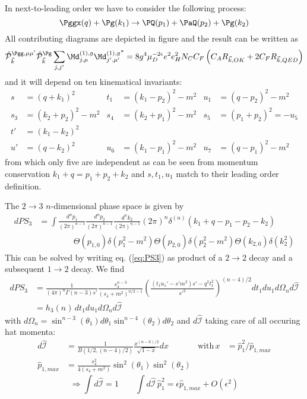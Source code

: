\label{sec:NLO.g}
In next-to-leading order we have to consider the following process:
\begin{equation}
\Pggx(q) + \Pg(k_1) \rightarrow \PQ(p_1)+\PaQ(p_2) + \Pg(k_2)
\end{equation}
All contributing diagrams are depicted in figure  and the result can be written as
\begin{equation}
\hat {\mathcal P}_{\vec k}^{\Pgg,\mu\mu'}\hat {\mathcal P}_{\vec k}^{\Pg}\sum_{j,j'}{\Md^{(1),g}_{j,\mu}\Md^{(1),g}_{j',\mu'}}^* = 8g^4\mu_D^{-2\epsilon}e^2e_H^2 N_C C_F\left( C_A R_{\vec k,OK} + 2C_F R_{\vec k,QED}\right)
\end{equation}
and it will depend on ten kinematical invariants:
\begin{align}
s &= (q+k_1)^2 &t_1 &=(k_1-p_2)^2-m^2 &u_1 &=(q-p_2)^2 -m^2\\
s_3 &= (k_2+p_2)^2-m^2 &s_4 &=(k_2+p_1)^2-m^2 &s_5 &= (p_1+p_2)^2=-u_5\\
t' &= (k_1-k_2)^2\\
u' &= (q-k_2)^2 &u_6 &=(k_1-p_1)^2-m^2 &u_7 &=(q-p_1)^2-m^2
\end{align}
from which only five are independent as can be seen from momentum conservation $k_1+q=p_1+p_2+k_2$ and $s,t_1,u_1$ match to their leading order definition.

The $2\rightarrow 3$ $n$-dimensional phase space is given by
\begin{align}
dPS_3 &= \!\int\!\!\frac{d^{n}p_1}{(2\pi)^{n-1}}\frac{d^{n}p_2}{(2\pi)^{n-1}}\frac{d^{n}k_2}{(2\pi)^{n-1}}(2\pi)^n\delta^{(n)}(k_1+q-p_1-p_2-k_2) \nonumber\\
 &\hspace{50pt}\Theta(p_{1,0})\delta(p_1^2-m^2)\Theta(p_{2,0})\delta(p_2^2-m^2)\Theta(k_{2,0})\delta(k_2^2) \label{eq:PS3}
\end{align}
This can be solved by writing eq. (\ref{eq:PS3}) as product of a $2\rightarrow 2$ decay and a subsequent $1\rightarrow 2$ decay\cite{PhysRevD4054}. We find
\begin{align}
dPS_3 &= \frac 1 {(4\pi)^n\Gamma(n-3)s'} \frac{s_4^{n-3}}{(s_4+m^2)^{n/2-1}}\left(\frac{(t_1u_1'-s'm^2)s' - q^2t_1^2}{s'^2}\right)^{(n-4)/2}\! dt_1 du_1 d\Omega_n d\hat{\mathcal I}\\
 &=h_3(n)\,dt_1 du_1 d\Omega_n d\hat{\mathcal I}
\end{align}
with $d\Omega_n = \sin^{n-3}(\theta_1)d\theta_1\sin^{n-4}(\theta_2)d\theta_2$ and $d\hat{\mathcal I}$ taking care of all occuring hat momenta:
\begin{align}
d\hat{\mathcal I} &= \frac 1 {B(1/2,(n-4)/2)}\frac{x^{(n-6)/2}}{\sqrt{1-x}}dx &\text{with}\,x &= \hat p_1^2/\hat p_{1,max}\\
\hat p_{1,max} &= \frac{s_4^2}{4(s_4+m^2)}\sin^2(\theta_1)\sin^2(\theta_2)
\end{align}
\begin{equation}
\Rightarrow \int\!d\hat{\mathcal I} = 1 \qquad \int\!d\hat{\mathcal I}\,\hat p_1^2 = \epsilon \hat p_{1,max} + O(\epsilon^2)
\end{equation}

